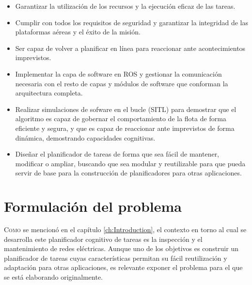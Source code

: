 \documentclass[fontsize=11pt, English=false, Español=true, Myfinal=true, twoside, numbers=noenddot]{scrbook}
\begin{document}
{\begin{itemize}
    \item Garantizar la utilización de los recursos y la ejecución eficaz de las tareas.
    \item Cumplir con todos los requisitos de seguridad y garantizar la integridad de las plataformas aéreas y el éxito de la misión.
    \item Ser capaz de volver a planificar en línea para reaccionar ante acontecimientos imprevistos.
    \item Implementar la capa de software en \gls{ROS} y gestionar la comunicación necesaria con el resto de capas y módulos de software que conforman la arquitectura completa.
    \item Realizar simulaciones de sofware en el bucle (\gls{SITL}) para demostrar que el algoritmo es capaz de gobernar el comportamiento de la flota de forma eficiente y segura, y que es capaz de reaccionar ante imprevistos de forma dinámica, demostrando capacidades cognitivas.
    \item Diseñar el planificador de tareas de forma que sea fácil de mantener, modificar o ampliar, buscando que sea modular y reutilizable para que pueda servir de base para la construcción de planificadores para otras aplicaciones.
\end{itemize}

%
%
% 
%
%
%
\chapter{Formulación del problema}
\label{ch:ProblemFormulation}
\lettrine[lraise=-0.1, lines=2, loversize=0.2]{C}{omo} se mencionó en el capítulo \ref{ch:Introduction}, el contexto en torno al cual se desarrolla este planificador cognitivo de tareas es la inspección y el mantenimiento de redes eléctricas. Aunque uno de los objetivos es construir un planificador de tareas cuyas características permitan su fácil reutilización y adaptación para otras aplicaciones, es relevante exponer el problema para el que se está elaborando originalmente. 

}
\end{document}
